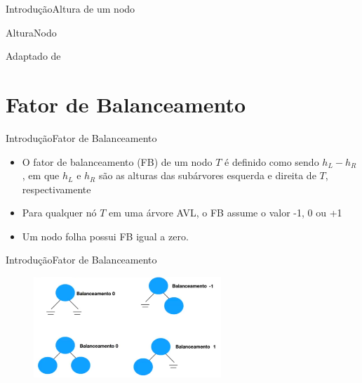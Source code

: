 \documentclass[aspectratio=169]{beamer}
\begin{document}

\begin{frame}{Introdução}{Altura de um nodo}
\begin{algorithm}[H]
\caption{AlturaNodo} 
\label{AlturaNodo}
\end{algorithm}
\tiny{Adaptado de \cite{Backes2016}}  
\end{frame}

\section{Fator de Balanceamento}

\begin{frame}{Introdução}{Fator de Balanceamento}
\begin{itemize}
 \item O fator de balanceamento (FB) de um nodo $T$ é definido como sendo $h_L - h_R$, em que $h_L$ e $h_R$ são as alturas das subárvores esquerda e direita de $T$, respectivamente
 \item Para qualquer nó $T$ em uma árvore AVL, o FB assume o valor -1, 0 ou +1
 \item Um nodo folha possui FB igual a zero.
\end{itemize}
\end{frame}


\begin{frame}{Introdução}{Fator de Balanceamento}
\begin{figure}[!h]
  \centering
   \includegraphics[width=200pt]{imagens/balanceamento.png}
  \label{fig_balanced_tree}
\end{figure}
\end{frame}

\end{document}
